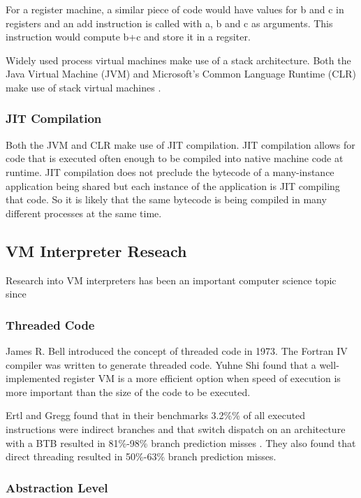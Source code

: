 \documentclass[english,a4paper]{article}
\begin{document}
For a register machine, a similar piece of code would have values for
b and c in registers and an add instruction is called with a, b and c
as arguments. This instruction would compute b+c and store it in a
regsiter.

Widely used process virtual machines make use of a stack
architecture. Both the Java Virtual Machine (JVM) and Microsoft's
Common Language Runtime (CLR) make use of stack virtual machines
\cite{CLI}\cite{JVM}.

\subsubsection{JIT Compilation}

Both the JVM and CLR make use of JIT compilation\cite{JJIT}. JIT
compilation allows for code that is executed often enough to be
compiled into native machine code at runtime. JIT compilation does not
preclude the bytecode of a many-instance application being shared but
each instance of the application is JIT compiling that code. So it is
likely that the same bytecode is being compiled in many different
processes at the same time.

\subsection{VM Interpreter Reseach}

Research into VM interpreters has been an important computer science topic since 

\subsubsection{Threaded Code}

James R. Bell introduced the concept of threaded code in 1973. The
Fortran IV compiler was written to generate threaded code.\cite{Bell}
Yuhne Shi\cite{Shi2007} found that a well-implemented register VM is a
more efficient option when speed of execution is more important than
the size of the code to be executed.

Ertl and Gregg found that in their benchmarks 3.2\%\% of
all executed instructions were indirect branches and that switch
dispatch on an architecture with a BTB resulted in 81\%-98\% branch
prediction misses \cite{EfficientInterpreters}. They also found that
direct threading resulted in 50\%-63\% branch prediction misses.

\subsubsection{Abstraction Level}
\end{document}
